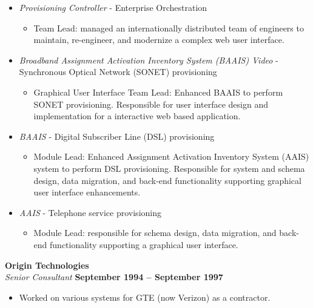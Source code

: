 \documentclass[margin,line]{resume}
\begin{document}
\begin{resume}
\begin{itemize}
\begin{itemize}
\begin{itemize}
      \end{itemize}
      \item \textsl{Provisioning Controller} - Enterprise Orchestration
      \begin{itemize}
          \item Team Lead: managed an internationally distributed team of engineers to maintain, re-engineer, and modernize a complex web user interface.
      \end{itemize}
      \item \textsl{Broadband Assignment Activation Inventory System (BAAIS) Video} - Synchronous Optical Network (SONET) provisioning
      \begin{itemize}
          \item Graphical User Interface Team Lead: Enhanced BAAIS to perform SONET provisioning. Responsible for user interface design and implementation for a interactive web based application.
      \end{itemize}
      \item \textsl{BAAIS} - Digital Subscriber Line (DSL) provisioning
      \begin{itemize}
          \item Module Lead: Enhanced Assignment Activation Inventory System (AAIS) system to perform DSL provisioning. Responsible for system and schema design, data migration, and back-end functionality supporting graphical user interface enhancements.
      \end{itemize}
      \item \textsl{AAIS} - Telephone service provisioning
      \begin{itemize}
          \item Module Lead: responsible for schema design, data migration, and back-end functionality supporting a graphical user interface.
      \end{itemize}
      \end{itemize}
    \end{itemize}

    \textbf{\listing Origin Technologies} \vspace{2mm}\\\vspace{1mm}%
    \textsl{Senior Consultant} \hfill \textbf{September 1994 -- September 1997}\\
    \begin{itemize}
        \item Worked on various systems for GTE (now Verizon) as a contractor.
    \end{itemize}
    


\end{resume}
\end{document}
